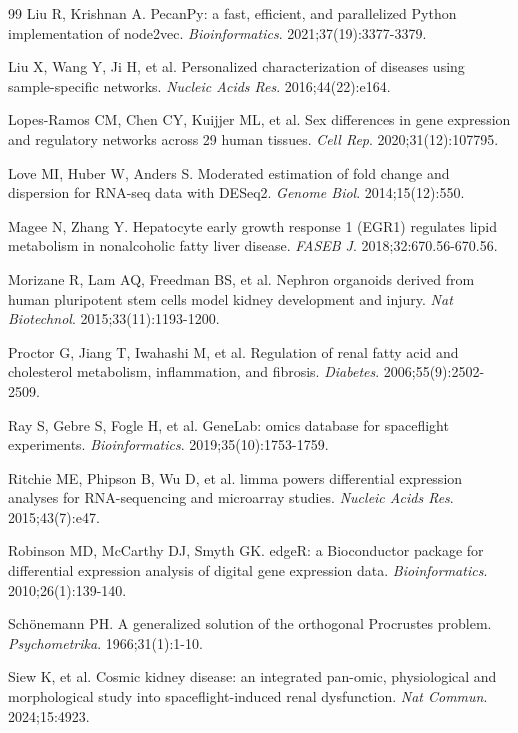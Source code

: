 \documentclass[11pt]{article}
\begin{document}
\begin{thebibliography}{99}
 Liu R, Krishnan A. PecanPy: a fast, efficient, and parallelized Python implementation of node2vec. \emph{Bioinformatics}. 2021;37(19):3377-3379.

 Liu X, Wang Y, Ji H, et al. Personalized characterization of diseases using sample-specific networks. \emph{Nucleic Acids Res}. 2016;44(22):e164.

 Lopes-Ramos CM, Chen CY, Kuijjer ML, et al. Sex differences in gene expression and regulatory networks across 29 human tissues. \emph{Cell Rep}. 2020;31(12):107795.

 Love MI, Huber W, Anders S. Moderated estimation of fold change and dispersion for RNA-seq data with DESeq2. \emph{Genome Biol}. 2014;15(12):550.

 Magee N, Zhang Y. Hepatocyte early growth response 1 (EGR1) regulates lipid metabolism in nonalcoholic fatty liver disease. \emph{FASEB J}. 2018;32:670.56-670.56.

 Morizane R, Lam AQ, Freedman BS, et al. Nephron organoids derived from human pluripotent stem cells model kidney development and injury. \emph{Nat Biotechnol}. 2015;33(11):1193-1200.

 Proctor G, Jiang T, Iwahashi M, et al. Regulation of renal fatty acid and cholesterol metabolism, inflammation, and fibrosis. \emph{Diabetes}. 2006;55(9):2502-2509.

 Ray S, Gebre S, Fogle H, et al. GeneLab: omics database for spaceflight experiments. \emph{Bioinformatics}. 2019;35(10):1753-1759.

 Ritchie ME, Phipson B, Wu D, et al. limma powers differential expression analyses for RNA-sequencing and microarray studies. \emph{Nucleic Acids Res}. 2015;43(7):e47.

 Robinson MD, McCarthy DJ, Smyth GK. edgeR: a Bioconductor package for differential expression analysis of digital gene expression data. \emph{Bioinformatics}. 2010;26(1):139-140.

 Sch\"onemann PH. A generalized solution of the orthogonal Procrustes problem. \emph{Psychometrika}. 1966;31(1):1-10.

 Siew K, et al. Cosmic kidney disease: an integrated pan-omic, physiological and morphological study into spaceflight-induced renal dysfunction. \emph{Nat Commun}. 2024;15:4923.


\end{thebibliography}
\end{document}
